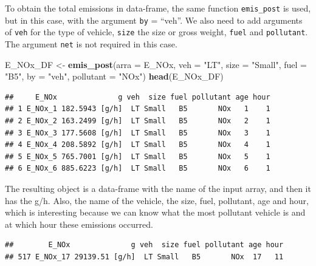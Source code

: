 \documentclass[12pt,graybox,envcountchap,sectrefs]{krantz}
\makeatletter
\newenvironment{Shaded}{\begin{snugshade}}{\end{snugshade}}
\newcommand{\KeywordTok}[1]{\textcolor[rgb]{0.13,0.29,0.53}{\textbf{#1}}}
\newcommand{\DataTypeTok}[1]{\textcolor[rgb]{0.13,0.29,0.53}{#1}}
\newcommand{\StringTok}[1]{\textcolor[rgb]{0.31,0.60,0.02}{#1}}
\newcommand{\OperatorTok}[1]{\textcolor[rgb]{0.81,0.36,0.00}{\textbf{#1}}}
\newcommand{\NormalTok}[1]{#1}
\newenvironment{kframe}{%
\medskip{}
\setlength{\fboxsep}{.8em}
 \def\at@end@of@kframe{}%
 \ifinner\ifhmode%
  \def\at@end@of@kframe{\end{minipage}}%
  \begin{minipage}{\columnwidth}%
 \fi\fi%
 \def\FrameCommand##1{\hskip\@totalleftmargin \hskip-\fboxsep
 \colorbox{shadecolor}{##1}\hskip-\fboxsep
     \hskip-\linewidth \hskip-\@totalleftmargin \hskip\columnwidth}%
 \MakeFramed {\advance\hsize-\width
   \@totalleftmargin\z@ \linewidth\hsize
   \@setminipage}}%
 {\par\unskip\endMakeFramed%
 \at@end@of@kframe}
\renewenvironment{Shaded}{\begin{kframe}}{\end{kframe}}
\theoremstyle{definition}
\theoremstyle{definition}
\theoremstyle{definition}
\theoremstyle{remark}
\makeatother
\begin{document}
To obtain the total emissions in data-frame, the same function
\texttt{emis\_post} is used, but in this case, with the argument
\texttt{by} = ``veh''. We also need to add arguments of \texttt{veh} for
the type of vehicle, \texttt{size} the size or gross weight,
\texttt{fuel} and \texttt{pollutant}. The argument \texttt{net} is not
required in this case.

\begin{Shaded}
\begin{Highlighting}[]
\NormalTok{E_NOx_DF <-}\StringTok{ }\KeywordTok{emis_post}\NormalTok{(}\DataTypeTok{arra =}\NormalTok{ E_NOx, }\DataTypeTok{veh =} \StringTok{"LT"}\NormalTok{, }\DataTypeTok{size =} \StringTok{"Small"}\NormalTok{, }\DataTypeTok{fuel =} \StringTok{"B5"}\NormalTok{,}
                      \DataTypeTok{by =} \StringTok{"veh"}\NormalTok{, }\DataTypeTok{pollutant =} \StringTok{"NOx"}\NormalTok{)}
\KeywordTok{head}\NormalTok{(E_NOx_DF)}
\end{Highlighting}
\end{Shaded}

\begin{verbatim}
##     E_NOx              g veh  size fuel pollutant age hour
## 1 E_NOx_1 182.5943 [g/h]  LT Small   B5       NOx   1    1
## 2 E_NOx_2 163.2499 [g/h]  LT Small   B5       NOx   2    1
## 3 E_NOx_3 177.5608 [g/h]  LT Small   B5       NOx   3    1
## 4 E_NOx_4 208.5892 [g/h]  LT Small   B5       NOx   4    1
## 5 E_NOx_5 765.7001 [g/h]  LT Small   B5       NOx   5    1
## 6 E_NOx_6 885.6223 [g/h]  LT Small   B5       NOx   6    1
\end{verbatim}

The resulting object is a data-frame with the name of the input array,
and then it has the g/h. Also, the name of the vehicle, the size, fuel,
pollutant, age and hour, which is interesting because we can know what
the most pollutant vehicle is and at which hour these emissions
occurred.

\begin{Shaded}
\end{Shaded}

\begin{verbatim}
##        E_NOx              g veh  size fuel pollutant age hour
## 517 E_NOx_17 29139.51 [g/h]  LT Small   B5       NOx  17   11
\end{verbatim}
\end{document}
